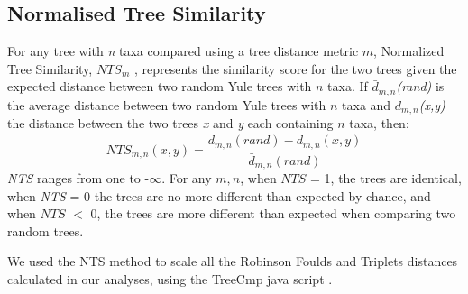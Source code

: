 \subsection{Normalised Tree Similarity}
For any tree with \textit{n} taxa compared using a tree distance metric $m$, Normalized Tree Similarity, $NTS_m$ \citep{Bogdanowicz2012}, represents the similarity score for the two trees given the expected distance between two random Yule trees with $n$ taxa. If $\bar{d}_{m,n}$\textit{(rand)} is the average distance between two random Yule trees with $n$ taxa and $d_{m,n}$\textit{(x,y)} the distance between the two trees \textit{x} and \textit{y} each containing $n$ taxa, then:
\begin{equation}
NTS_{m,n}(x,y)=\frac{\bar{d}_{m,n}(rand) - d_{m,n}(x,y)} {\bar{d}_{m,n}(rand)}
\end{equation}
\textit{NTS} ranges from one to -$\infty$.
For any $m,n$, when $NTS$ = 1, the trees are identical, when \textit{NTS} = 0 the trees are no more different than expected by chance, and when $NTS$ $<$ 0, the trees are more different than expected when comparing two random trees. 

We used the NTS method to scale all the Robinson Foulds and Triplets distances calculated in our analyses, using the TreeCmp java script \citep{Bogdanowicz2012}.


